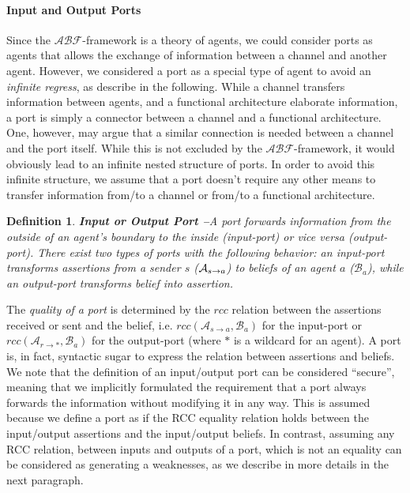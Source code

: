 \documentclass[conference]{IEEEtran}
\newcommand{\assertionRegion}{\mathcal{A}}
\newcommand{\beliefRegion}{\mathcal{B}}
\newcommand{\factRegion}{\mathcal{F}}
\newcommand{\rcc}{rcc}
\newcommand{\abftheory}{\assertionRegion\beliefRegion\factRegion}
\newcommand{\Rcc}[2]{rcc(#1,#2)}
\newcommand{\rassert}[3]{\mathcal{A}_{#1\rightarrow #2}#3}
\newtheorem{definition}{Definition}%
\begin{document}
\paragraph{Input and Output Ports}
Since the $\abftheory$-framework is a theory of agents, we could consider ports as
agents that allows the exchange of information between a channel and another
agent.  However, we considered a port as a special type of agent to avoid
an \emph{infinite regress}, as describe in the following. While a channel transfers information between agents, and
a functional architecture elaborate information, a port is simply a connector between
a channel and a functional architecture. One, however, may argue that a similar
connection is needed between a channel and the port itself. While this is not 
excluded by the $\abftheory$-framework, it would obviously lead to an infinite
nested structure of ports. In order to avoid this infinite structure, we assume
that a port doesn't require any other means to transfer information from/to a channel
or from/to a functional architecture. 

\begin{definition}{\bf Input or Output Port --}\label{def:port} 
	A port forwards information from the outside of an agent's boundary to
	the inside (input-port) or vice versa (output-port).  There exist two
	types of ports with the following behavior: an input-port 
	transforms assertions from a sender $s$ ($\rassert{s}{a}$) to beliefs
	of an agent $a$ ($\beliefRegion_a$), while an output-port transforms belief
	into assertion.
\end{definition}
The \emph{quality of a port} is determined by the $\rcc$ relation between the
assertions received or sent and the belief, i.e.
$\Rcc{\rassert{s}{a}}{\beliefRegion_a}$ for the input-port or
$\Rcc{\rassert{r}{*}}{\beliefRegion_a}$ for the output-port (where $*$ is a wildcard for an agent).  A port is, in
fact, syntactic sugar to express the relation between assertions and beliefs.
We note that the definition of an input/output port can
be considered ``secure'', meaning that we implicitly formulated the requirement
that a port always forwards the information without modifying it in any way.
This is assumed because we define a port as if the RCC equality relation holds
between the input/output assertions and the input/output beliefs.  In contrast,
assuming any RCC relation, between inputs and outputs of a port, which is not
an equality can be considered as generating a weaknesses, as we describe in
more details in the next paragraph.
\end{document}
